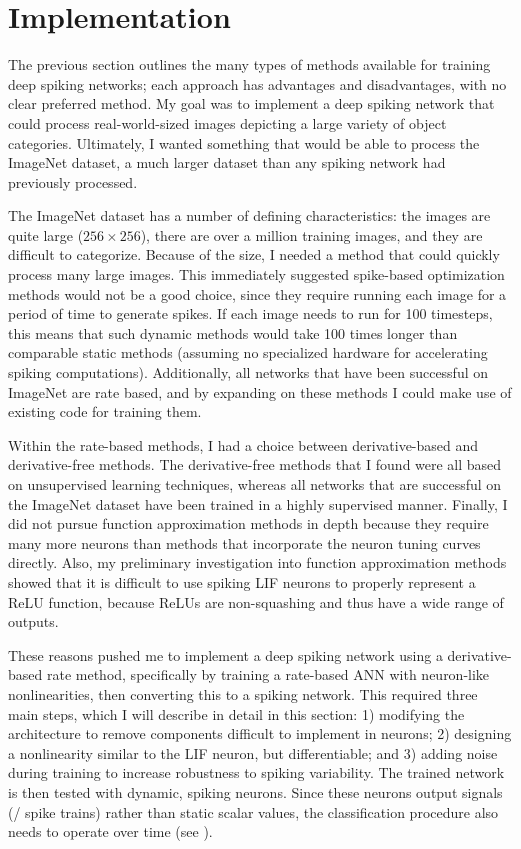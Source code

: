 

\section{Implementation}

The previous section outlines the many types of methods available
for training deep spiking networks;
each approach has advantages and disadvantages,
with no clear preferred method.
My goal was to implement a deep spiking network
that could process real-world-sized images
depicting a large variety of object categories.
Ultimately, I wanted something that would be able to
process the ImageNet dataset,
a much larger dataset than any spiking network had previously processed.

The ImageNet dataset has a number of defining characteristics:
the images are quite large ($256 \times 256$),
there are over a million training images,
and they are difficult to categorize.
Because of the size, I needed a method that could quickly process
many large images.
This immediately suggested spike-based optimization methods
would not be a good choice,
since they require running each image for a period of time to generate spikes.
If each image needs to run for 100 timesteps,
this means that such dynamic methods would take 100 times longer
than comparable static methods
(assuming no specialized hardware for accelerating spiking computations).
Additionally, all networks that have been successful on ImageNet
are rate based, and by expanding on these methods
I could make use of existing code for training them.

Within the rate-based methods,
I had a choice between derivative-based and derivative-free methods.
The derivative-free methods that I found were all based on
unsupervised learning techniques,
whereas all networks that are successful on the ImageNet dataset
have been trained in a highly supervised manner.
Finally, I did not pursue function approximation methods in depth
because they require many more neurons than methods that incorporate
the neuron tuning curves directly.
Also, my preliminary investigation into function approximation methods
showed that it is difficult to use spiking LIF neurons to properly
represent a ReLU function,
because ReLUs are non-squashing and thus have a wide range of outputs.

These reasons pushed me to implement a deep spiking network
using a derivative-based rate method,
specifically by training a rate-based ANN with neuron-like nonlinearities,
then converting this to a spiking network.
This required three main steps, which I will describe in detail in this section:
1) modifying the architecture to remove components difficult
to implement in neurons;
2) designing a nonlinearity similar to the LIF neuron, but differentiable;
and 3) adding noise during training to increase robustness to spiking variability.
The trained network is then tested with dynamic, spiking neurons.
Since these neurons output signals (\ie/ spike trains)
rather than static scalar values,
the classification procedure also needs to operate over time (see ).

